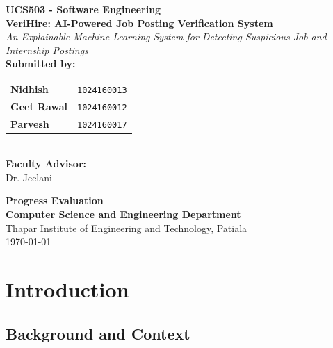 \documentclass[12pt,a4paper]{report}
\begin{document}
\begin{titlepage}
    \centering
    \vspace*{0.5cm}

    {\large \textbf{UCS503 - Software Engineering}}\\[1.5cm]

    {\LARGE \textbf{VeriHire: AI-Powered Job Posting Verification System}}\\[0.5cm]

    {\large \textit{An Explainable Machine Learning System for Detecting Suspicious Job and Internship Postings}}\\[2cm]

    \textbf{Submitted by:}\\[0.3cm]

    \begin{tabular}{ll}
        \textbf{Nidhish} & \texttt{1024160013} \\
        \textbf{Geet Rawal} & \texttt{1024160012} \\
        \textbf{Parvesh} & \texttt{1024160017} \\
    \end{tabular}\\[1.5cm]

    \textbf{Faculty Advisor:}\\
    Dr. Jeelani\\[2cm]

    \vfill

    {\large \textbf{Progress Evaluation}}\\[0.2cm]
    {\bfseries Computer Science and Engineering Department}\\[0.15cm]
    Thapar Institute of Engineering and Technology, Patiala\\[0.5cm]
    \today

\end{titlepage}


\tableofcontents
\newpage


\chapter{Introduction}

\section{Background and Context}
\end{document}
